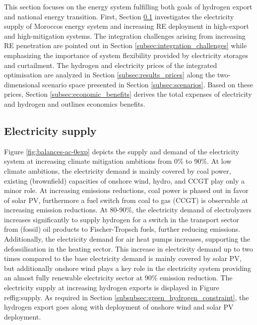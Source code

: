 
This section focuses on the energy system fulfilling both goals of hydrogen export and national energy transition. First, Section \ref{subsec:supply} investigates the electricity supply of Moroccos energy system and increasing RE deployment in high-export and high-mitigation systems.
The integration challenges arising from increasing RE penetration are pointed out in Section \ref{subsec:integration_challenges} while emphasizing the importance of system flexibility provided by electricity storages and curtailment. The hydrogen and electricity prices of the integrated optimisation are analyzed in Section \ref{subsec:results_prices} along the two-dimensional scenario space presented in Section \ref{subsec:scenarios}. Based on these prices, Section \ref{subsec:economic_benefits} derives the total expenses of electricity and hydrogen and outlines economics benefits. 

\label{subsec:supply}
\label{subsec:integration_challenges}
\label{subsec:results_prices}
\label{subsec:economic_benefits}
\label{subsec:sensitivity}

\subsection{Electricity supply}
\label{subsec:supply}
Figure \ref{fig:balances-ac-0exp} depicts the supply and demand of the electricity system at increasing climate mitigation ambitions from 0\% to 90\%. At low climate ambitions, the electricity demand is mainly covered by coal power, existing (brownfield) capacities of onshore wind, hydro, and CCGT play only a minor role. At increasing emissions reductions, coal power is phased out in favor of solar PV, furthermore a fuel switch from coal to gas (CCGT) is observable at increasing emission reductions. At 80-90\%, the electricity demand of electrolyzers increases significantly to supply hydrogen for a switch in the transport sector from (fossil) oil products to Fischer-Tropsch fuels, further reducing emissions. Additionally, the electricity demand for air heat pumps increases, supporting the defossilisation in the heating sector. This increase in electricity demand up to two times compared to the base electricity demand is mainly covered by solar PV, but additionally onshore wind plays a key role in the electricity system providing an almost fully renewable electricity sector at 90\% emission reduction.
The electricity supply at increasing hydrogen exports is displayed in Figure ref{fig:supply}. As required in Section \ref{subsubsec:green_hydrogen_constraint}, the hydrogen export goes along with deployment of onshore wind and solar PV deployment.

